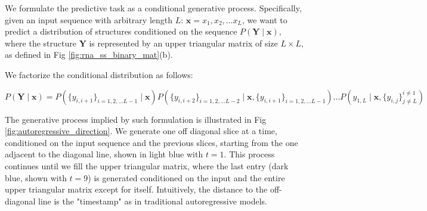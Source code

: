 \documentclass{article}
\begin{document}
We formulate the predictive task as a conditional generative process.
Specifically, given an input sequence with arbitrary length $L$: $\bm{x} = x_1, x_2, \dots x_{L}$,
we want to predict a distribution of structures conditioned on the sequence $P(\bm{Y} \mid \bm{x})$,
where the structure $\bm{Y}$ is represented by an upper triangular matrix of size $L \times L$, as defined in Fig \ref{fig:rna_ss_binary_mat}(b).


We factorize the conditional distribution as follows:

\begin{equation} \label{eq:conditional_distribution}
P(\bm{Y} \mid \bm{x}) = P(\{y_{i, i+1}\}_{i=1, 2, \dots L-1} \mid \bm{x})
P(\{y_{i, i+2}\}_{i=1, 2, \dots L-2} \mid \bm{x}, \{y_{i, i+1}\}_{i=1, 2, \dots L-1})
\dots
P(y_{1, L} \mid \bm{x}, \{y_{i, j}\}^{i \neq 1}_{j \neq L})
\end{equation}


The generative process implied by such formulation is illustrated in Fig \ref{fig:autoregressive_direction}.
We generate one off diagonal slice at a time, conditioned on the input sequence and the previous slices,
starting from the one adjacent to the diagonal line, shown in light blue with $t=1$.
This process continues until we fill the upper triangular matrix,
where the last entry (dark blue, shown with $t=9$) is generated conditioned on the input and the entire upper triangular matrix except for itself.
Intuitively, the distance to the off-diagonal line is the "timestamp" as in traditional autoregressive models.

%
%
\end{document}
